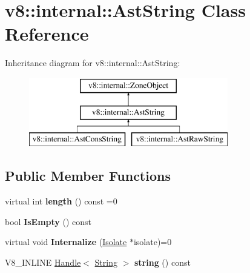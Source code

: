\hypertarget{classv8_1_1internal_1_1_ast_string}{}\section{v8\+:\+:internal\+:\+:Ast\+String Class Reference}
\label{classv8_1_1internal_1_1_ast_string}
Inheritance diagram for v8\+:\+:internal\+:\+:Ast\+String\+:\begin{figure}[H]
\begin{center}
\leavevmode
\includegraphics[height=3.000000cm]{classv8_1_1internal_1_1_ast_string}
\end{center}
\end{figure}
\subsection*{Public Member Functions}
\begin{DoxyCompactItemize}
\item 
virtual int {\bfseries length} () const  =0\hypertarget{classv8_1_1internal_1_1_ast_string_af83c51ee32c8cb8bd4d438732d3c2a81}{}\label{classv8_1_1internal_1_1_ast_string_af83c51ee32c8cb8bd4d438732d3c2a81}

\item 
bool {\bfseries Is\+Empty} () const \hypertarget{classv8_1_1internal_1_1_ast_string_a9012cbd49b91d14842777274e713b068}{}\label{classv8_1_1internal_1_1_ast_string_a9012cbd49b91d14842777274e713b068}

\item 
virtual void {\bfseries Internalize} (\hyperlink{classv8_1_1internal_1_1_isolate}{Isolate} $\ast$isolate)=0\hypertarget{classv8_1_1internal_1_1_ast_string_a7781994a37eb574c340844cfb235dd25}{}\label{classv8_1_1internal_1_1_ast_string_a7781994a37eb574c340844cfb235dd25}

\item 
V8\+\_\+\+I\+N\+L\+I\+NE \hyperlink{classv8_1_1internal_1_1_handle}{Handle}$<$ \hyperlink{classv8_1_1internal_1_1_string}{String} $>$ {\bfseries string} () const \hypertarget{classv8_1_1internal_1_1_ast_string_a44a57fccc07afe69c83171d66a334291}{}\label{classv8_1_1internal_1_1_ast_string_a44a57fccc07afe69c83171d66a334291}

\end{DoxyCompactItemize}

